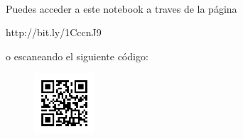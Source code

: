 \documentclass{article}
\begin{document}
    \begin{center}
    \end{center}
    { \hspace*{\fill} \\}
    
    Puedes acceder a este notebook a traves de la página

http://bit.ly/1CccnJ9

o escaneando el siguiente código:

\begin{figure}[htbp]
\centering
\includegraphics[width=0.2\textwidth]{codigos/codigo6.jpg}
\end{figure}
        

    
    
    
    
\end{document}
